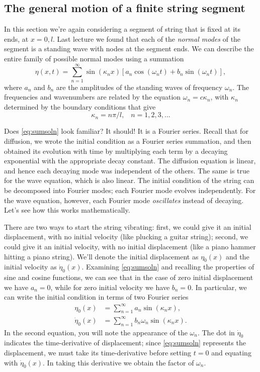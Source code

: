 \documentclass[11pt,twoside,a4paper]{article}
\begin{document}
\subsection{The general motion of a finite string segment}

In this section we're again considering a segment of string that is
fixed at its ends, at $x=0,l$.   Last lecture we found that
each of the \textit{normal modes} of the segment is a standing wave
with nodes at the segment ends.  We can describe the entire family of
possible normal modes using a summation
\begin{equation}
  \label{eq:sumsoln}
  \eta(x,t) = \sum_{n=1}^\infty \sin(\kappa_nx)
  \left[a_n\cos(\omega_nt) + b_n\sin(\omega_nt)\right],
\end{equation}
where $a_n$ and $b_n$ are the amplitudes of the standing waves of
frequency $\omega_n$.  The frequencies and wavenumbers are related by
the equation $\omega_n = c\kappa_n$, with $\kappa_n$ determined by the
boundary conditions that give
\begin{displaymath}
  \kappa_n = n\pi/l,\;\;\;n=1,2,3,...
\end{displaymath}

Does \autoref{eq:sumsoln} look familiar?  It should!  It is a Fourier
series.  Recall that for diffusion, we wrote the initial condition as
a Fourier series summation, and then obtained its evolution with time
by multiplying each term by a decaying exponential with the
appropriate decay constant.  The diffusion equation is linear, and
hence each decaying mode was independent of the others.  The same is
true for the wave equation, which is also linear.  The initial
condition of the string can be decomposed into Fourier modes; each
Fourier mode evolves independently.  For the wave equation, however,
each Fourier mode \textit{oscillates} instead of decaying.  Let's see
how this works mathematically.

There are two ways to start the string vibrating: first, we could give
it an initial displacement, with no initial velocity (like plucking a
guitar string); second, we could give it an initial velocity, with no
initial displacement (like a piano hammer hitting a piano string).
We'll denote the initial displacement as $\eta_0(x)$ and the initial
velocity as $\dot{\eta}_0(x)$. Examining \autoref{eq:sumsoln} and
recalling the properties of sine and cosine functions, we can see that
in the case of zero initial displacement we have $a_n=0$, while for
zero initial velocity we have $b_n=0$.  In particular, we can write
the initial condition in terms of two Fourier series
\begin{align}
  \eta_0(x) &= \sum_{n=1}^\infty a_n\sin(\kappa_nx),\\
  \dot{\eta}_0(x) &= \sum_{n=1}^\infty b_n\omega_n\sin(\kappa_nx).
\end{align}
In the second equation, you will note the appearance of the
$\omega_n$. The dot in $\dot{\eta}_0$ indicates the time-derivative of
displacement; since \autoref{eq:sumsoln} represents the displacement,
we must take its time-derivative before setting $t=0$ and equating
with $\dot{\eta}_0(x)$.  In taking this derivative we obtain the
factor of $\omega_n$.
\end{document}
